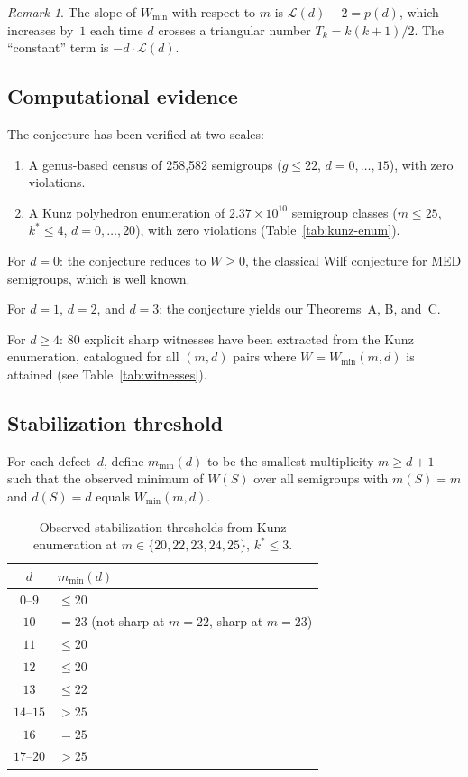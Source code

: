 \documentclass[11pt]{amsart}
\theoremstyle{definition}
\theoremstyle{remark}
\newtheorem{remark}[theorem]{Remark}
\begin{document}
\begin{remark}
The slope of $W_{\min}$ with respect to $m$ is
$\mathcal{L}(d) - 2 = p(d)$, which increases by~$1$ each time $d$ crosses
a triangular number $T_k = k(k+1)/2$.  The ``constant'' term is
$-d \cdot \mathcal{L}(d)$.
\end{remark}

\subsection{Computational evidence}

The conjecture has been verified at two scales:
\begin{enumerate}[nosep]
  \item A genus-based census of 258{,}582 semigroups ($g \le 22$,
    $d = 0, \ldots, 15$), with zero violations.
  \item A Kunz polyhedron enumeration of $2.37 \times 10^{10}$
    semigroup classes ($m \le 25$, $k^* \le 4$, $d = 0, \ldots, 20$),
    with zero violations (Table~\ref{tab:kunz-enum}).
\end{enumerate}

For $d = 0$: the conjecture reduces to $W \ge 0$, the classical Wilf conjecture
for MED semigroups, which is well known.

For $d = 1$, $d = 2$, and $d = 3$: the conjecture yields our Theorems~A, B, and~C.

For $d \ge 4$: $80$ explicit sharp witnesses have been extracted from the
Kunz enumeration, catalogued for all $(m, d)$ pairs where $W = W_{\min}(m, d)$
is attained (see Table~\ref{tab:witnesses}).

\subsection{Stabilization threshold}

For each defect~$d$, define $m_{\min}(d)$ to be the smallest multiplicity
$m \ge d + 1$ such that the observed minimum of $W(S)$ over all semigroups
with $m(S) = m$ and $d(S) = d$ equals $W_{\min}(m, d)$.

\begin{table}[ht]
\centering
\caption{Observed stabilization thresholds from Kunz enumeration
at $m \in \{20, 22, 23, 24, 25\}$, $k^* \le 3$.}\label{tab:mmin}
\begin{tabular}{cl}
\toprule
$d$ & $m_{\min}(d)$ \\
\midrule
$0$--$9$ & $\le 20$ \\
$10$ & $= 23$ (not sharp at $m = 22$, sharp at $m = 23$) \\
$11$ & $\le 20$ \\
$12$ & $\le 20$ \\
$13$ & $\le 22$ \\
$14$--$15$ & $> 25$ \\
$16$ & $= 25$ \\
$17$--$20$ & $> 25$ \\
\bottomrule
\end{tabular}
\end{table}
\end{document}
